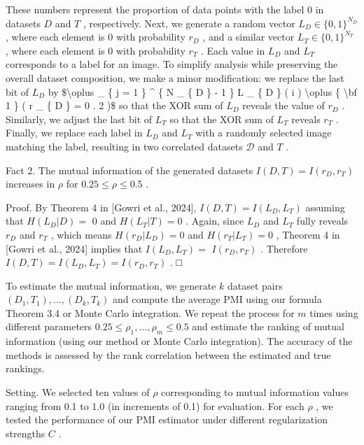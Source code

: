 These numbers represent the proportion of data points with the label 0
in datasets \(D\) and \(T\) , respectively. Next, we generate a random
vector \(L _ { D } \in \{ 0 , 1 \} ^ { N _ { D } }\) , where each
element is 0 with probability \(r _ { D }\) , and a similar vector
\(L _ { T } \in \{ 0 , 1 \} ^ { N _ { T } }\) , where each element is 0
with probability \(r _ { T }\) . Each value in \(L _ { D }\) and
\(L _ { T }\) corresponds to a label for an image. To simplify analysis
while preserving the overall dataset composition, we make a minor
modification: we replace the last bit of \(L _ { D }\) by
{\$\textbackslash oplus \_ \{ j = 1 \} \^{} \{ N \_ \{ D \} - 1 \} L \_
\{ D \} ( i ) \textbackslash oplus \{ \textbackslash bf 1 \} ( r \_ \{ D
\} = 0 . 2 )\$} so that the XOR sum of \(L _ { D }\) reveals the value
of \(r _ { D }\) . Similarly, we adjust the last bit of \(L _ { T }\) so
that the XOR sum of \(L _ { T }\) reveals \(r _ { T }\) . Finally, we
replace each label in \(L _ { D }\) and \(L _ { T }\) with a randomly
selected image matching the label, resulting in two correlated datasets
\(\mathcal { D }\) and \(T\) .

Fact 2. The mutual information of the generated datasets
\(I ( D , T ) = I ( r _ { D } , r _ { T } )\) increases in \(\rho\) for
\(0 . 2 5 \le \rho \le 0 . 5\) .

Proof. By Theorem 4 in {[}Gowri et al., 2024{]},
\(I ( D , T ) = I ( L _ { D } , L _ { T } )\) assuming that
\(H ( L _ { D } | D ) =\) 0 and \(H ( L _ { T } | T ) = 0\) . Again,
since \(L _ { D }\) and \(L _ { T }\) fully reveals \(r _ { D }\) and
\(r _ { T }\) , which means \(H ( r _ { D } | L _ { D } ) = 0\) and
\(H ( r _ { T } | L _ { T } ) = 0\) , Theorem 4 in {[}Gowri et al.,
2024{]} implies that \(I ( L _ { D } , L _ { T } ) =\)
\(I ( r _ { D } , r _ { T } )\) . Therefore
\(I ( D , T ) = I ( L _ { D } , L _ { T } ) = I ( r _ { D } , r _ { T } )\)
. □

To estimate the mutual information, we generate \(k\) dataset pairs
\(( D _ { 1 } , T _ { 1 } ) , \dots , ( D _ { k } , T _ { k } )\) and
compute the average PMI using our formula Theorem 3.4 or Monte Carlo
integration. We repeat the process for \(m\) times using different
parameters
\(0 . 2 5 \leq \rho _ { 1 } , . . . , \rho _ { m } \leq 0 . 5\) and
estimate the ranking of mutual information (using our method or Monte
Carlo integration). The accuracy of the methods is assessed by the rank
correlation between the estimated and true rankings.

Setting. We selected ten values of \(\rho\) corresponding to mutual
information values ranging from 0.1 to 1.0 (in increments of 0.1) for
evaluation. For each \(\rho\) , we tested the performance of our PMI
estimator under different regularization strengths \(C\) .


